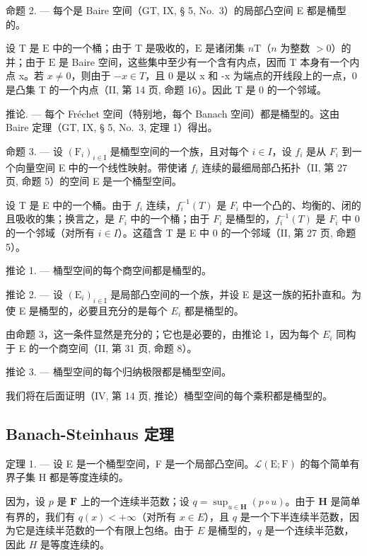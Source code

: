 命题 2. --- 每个是 Baire 空间（GT, IX, § 5, No.~3）的局部凸空间 E 都是桶型的。

设 \(\mathrm{T}\) 是 \(\mathrm{E}\) 中的一个桶；由于 \(\mathrm{T}\) 是吸收的，\(\mathrm{E}\) 是诸闭集 \(n\mathrm{T}\)（\(n\) 为整数 \(> 0\)）的并；由于 \(\mathrm{E}\) 是 Baire 空间，这些集中至少有一个含有内点，因而 T 本身有一个内点 x。若 \(x \neq 0\)，则由于 \(-x \in T\)，且 0 是以 x 和 -x 为端点的开线段上的一点，0 是凸集 T 的一个内点（II, 第 14 页, 命题 16）。因此 T 是 0 的一个邻域。

推论. --- 每个 Fréchet 空间（特别地，每个 Banach 空间）都是桶型的。这由 Baire 定理（GT, IX, § 5, No.~3, 定理 1）得出。

命题 3. --- 设 \((\mathrm{F}_{i})_{i\in\mathrm{I}}\) 是桶型空间的一个族，且对每个 \(i\in I\)，设 \(f_{i}\) 是从 \(F_{i}\) 到一个向量空间 E 中的一个线性映射。带使诸 \(f_{i}\) 连续的最细局部凸拓扑（II, 第 27 页, 命题 5）的空间 E 是一个桶型空间。

设 T 是 E 中的一个桶。由于 \(f_{i}\) 连续，\(f_{i}^{-1}(T)\) 是 \(F_{i}\) 中一个凸的、均衡的、闭的且吸收的集；换言之，是 \(F_{i}\) 中的一个桶；由于 \(F_{i}\) 是桶型的，\(f_{i}^{-1}(T)\) 是 \(F_{i}\) 中 0 的一个邻域（对所有 \(i \in I\)）。这蕴含 T 是 E 中 0 的一个邻域（II, 第 27 页, 命题 5）。

推论 1. --- 桶型空间的每个商空间都是桶型的。

推论 2. --- 设 \((\mathrm{E}_{i})_{i\in\mathrm{I}}\) 是局部凸空间的一个族，并设 E 是这一族的拓扑直和。为使 E 是桶型的，必要且充分的是每个 \(E_{i}\) 都是桶型的。

由命题 3，这一条件显然是充分的；它也是必要的，由推论 1，因为每个 \(E_{i}\) 同构于 E 的一个商空间（II, 第 31 页, 命题 8）。

推论 3. --- 桶型空间的每个归纳极限都是桶型空间。

我们将在后面证明（IV, 第 14 页, 推论）桶型空间的每个乘积都是桶型的。

\subsection{Banach-Steinhaus 定理}

定理 1. --- 设 E 是一个桶型空间，F 是一个局部凸空间。\(\mathcal{L}(\mathrm{E};\mathrm{F})\) 的每个简单有界子集 H 都是等度连续的。

因为，设 \(p\) 是 \(\mathbf{F}\) 上的一个连续半范数；设 \(q = \sup_{u\in \mathbf{H}}(p\circ u)\)。由于 \(\mathbf{H}\) 是简单有界的，我们有 \(q(x) < +\infty\)（对所有 \(x \in E\)），且 \(q\) 是一个下半连续半范数，因为它是连续半范数的一个有限上包络。由于 \(E\) 是桶型的，\(q\) 是一个连续半范数，因此 \(H\) 是等度连续的。

